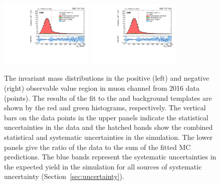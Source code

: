 \begin{figure}
    \includegraphics[width=0.4\textwidth]{figure/FitResult_16_mu_lep_tmass_obs14_p_chi2_20.pdf}
    \includegraphics[width=0.4\textwidth]{figure/FitResult_16_mu_lep_tmass_obs14_n_chi2_20.pdf}
    \caption[The \Mlb invariant mass distributions in muon channel from 2016 data.]
    {
        The \Mlb invariant mass distributions in the positive (left) and negative (right) observable value region in muon channel from 2016 data (points).
        The results of the fit to the \ttbar and background templates are shown by the red and green histograms, respectively.
        The vertical bars on the data points in the upper panels indicate the statistical uncertainties in the data and the hatched bands show the combined statistical and systematic uncertainties in the simulation.
        The lower panels give the ratio of the data to the sum of the fitted MC predictions.
        The blue bands represent the systematic uncertainties in the expected yield in the simulation for all sources of systematic uncertainty (Section~\ref{sec:uncertainty}).
    }
    \label{fig:fitting_results_16_mu}
\end{figure}
